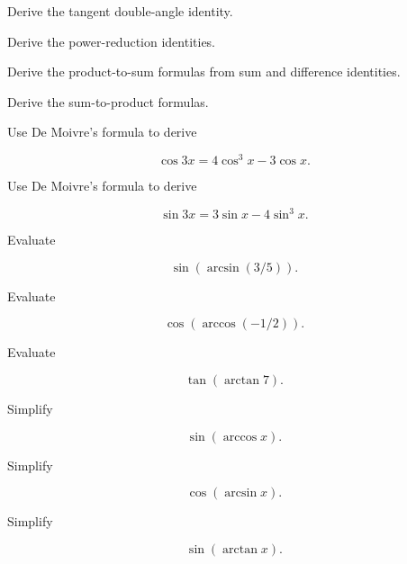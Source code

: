 \begin{exercise}[3]
Derive the tangent double-angle identity.
\end{exercise}

\begin{exercise}[3]
Derive the power-reduction identities.
\end{exercise}

\begin{exercise}[3]
Derive the product-to-sum formulas from sum and difference identities.
\end{exercise}

\begin{exercise}[3]
Derive the sum-to-product formulas.
\end{exercise}

\begin{exercise}[3]
Use De Moivre's formula to derive

\[
\cos3x
=
4\cos^3x-3\cos x.
\]
\end{exercise}

\begin{exercise}[3]
Use De Moivre's formula to derive

\[
\sin3x
=
3\sin x-4\sin^3x.
\]
\end{exercise}

\begin{exercise}[2]
Evaluate

\[
\sin(\arcsin(3/5)).
\]
\end{exercise}

\begin{exercise}[2]
Evaluate

\[
\cos(\arccos(-1/2)).
\]
\end{exercise}

\begin{exercise}[2]
Evaluate

\[
\tan(\arctan 7).
\]
\end{exercise}

\begin{exercise}[2]
Simplify

\[
\sin(\arccos x).
\]
\end{exercise}

\begin{exercise}[2]
Simplify

\[
\cos(\arcsin x).
\]
\end{exercise}

\begin{exercise}[2]
Simplify

\[
\sin(\arctan x).
\]
\end{exercise}

